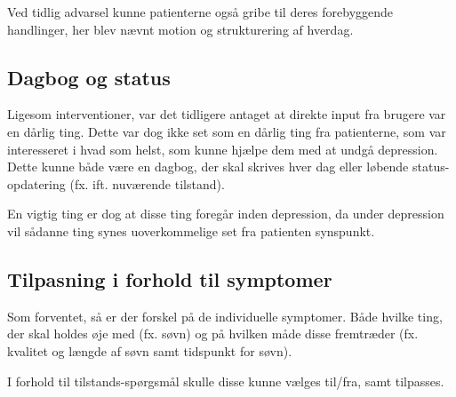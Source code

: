 Ved tidlig advarsel kunne patienterne også gribe til deres forebyggende handlinger, her blev nævnt motion og strukturering af hverdag.

\subsection{Dagbog og status}
Ligesom interventioner, var det tidligere antaget at direkte input fra brugere var en dårlig ting.
Dette var dog ikke set som en dårlig ting fra patienterne, som var interesseret i hvad som helst, som kunne hjælpe dem med at undgå depression.
Dette kunne både være en dagbog, der skal skrives hver dag eller løbende status-opdatering (fx. ift. nuværende tilstand).

En vigtig ting er dog at disse ting foregår inden depression, da under depression vil sådanne ting synes uoverkommelige set fra patienten synspunkt.

\subsection{Tilpasning i forhold til symptomer}
Som forventet, så er der forskel på de individuelle symptomer.
Både hvilke ting, der skal holdes øje med (fx. søvn) og på hvilken måde disse fremtræder (fx. kvalitet og længde af søvn samt tidspunkt for søvn).

I forhold til tilstands-spørgsmål skulle disse kunne vælges til/fra, samt tilpasses.
